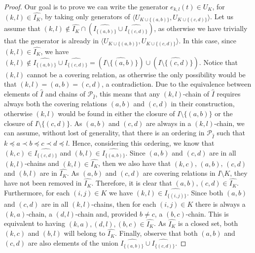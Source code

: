 \documentclass[11pt,letterpaper]{amsart}
\newcommand{\PP}{\mathcal{P}}
\begin{document}
\begin{proof}
Our goal is to prove we can write the generator $e_{k,l}(t)\in U_K$, for $(k,l)\in \widehat{I_K}$, by taking only generators of $\langle U_{K\cup \{(a,b)\}}, U_{K\cup \{(c,d)\}}\rangle$.
Let us assume that $(k,l) \notin \widehat{I_K}\cap (\widehat{I_{\{(a,b)\}}}\cup \widehat{I_{\{(c,d)\}}})$, as otherwise we have trivially that the generator is already in $\langle U_{K\cup \{(a,b)\}}, U_{K\cup \{(c,d)\}}\rangle$.
In this case, since $(k,l)\in \widehat{I_K}$, we have $(k,l)\notin \widehat{I_{\{(a,b)\}}}\cup \widehat{I_{\{(c,d)\}}}=(\widehat{I\setminus\{(a,b)\}})\cup (\widehat{I\setminus\{(c,d)\}})$. Notice that $(k,l)$ cannot be a covering relation, as otherwise the only possibility would be that $(k,l)=(a,b)=(c,d)$, a contradiction.
Due to the equivalence between elements of $\widehat{I}$ and chains of $\PP_{\widehat{I}}$, 
this means that any $(k,l)$-chain of $\widehat{I}$ requires always both the covering relations $(a,b)$ and $(c,d)$ in their construction, otherwise $(k,l)$ would be found in either the closure of $I\setminus\{(a,b)\}$ or the closure of $I\setminus\{(c,d)\}$.
As $(a,b)$ and $(c,d)$ are always in a $(k,l)$-chain, we can assume, without lost of generality, that there is an ordering in $\PP_{\widehat{I}}$ such that $k \preccurlyeq a \prec b\preccurlyeq c \prec d \preccurlyeq l$.
Hence, considering this ordering, we know that
$(k,c)\in \widehat{I_{\{(c,d)\}}}$ and $(b,l)\in \widehat{I_{\{(a,b)\}}}$.
Since $(a,b)$ and $(c,d)$ are in all $(k,l)$-chains and $(k,l)\in \widehat{I_K}$, then we also have that $(k,c)$, $(a,b)$, $(c,d)$ and $(b,l)$ are in $\widehat{I_K}$.
As $(a,b)$ and $(c,d)$ are covering relations in $I\setminus K$, they have not been removed in $\widehat{I_K}$. Therefore, it is clear that $(a,b),(c,d)\in \widehat{I_K}$.
Furthermore, for each $(i,j)\in K$ we have $(k,l)\in \widehat{I_{\{(i,j)\}}}$.
Since both $(a,b)$ and $(c,d)$ are in all $(k,l)$-chains, then for each $(i,j)\in K$ there is always a $(k,a)$-chain, a $(d,l)$-chain and, provided $b\neq c$, a $(b,c)$-chain. This is equivalent to having $(k,a),(d,l),(b,c)\in \widehat{I_K}$. As $\widehat{I_K}$ is a closed set, both $(k,c)$ and $(b,l)$ will belong to $\widehat{I_K}$.
Finally, observe that both $(a,b)$ and $(c,d)$ are also elements of the union $\widehat{I_{\{(a,b)\}}}\cup \widehat{I_{\{(c,d)\}}}$.


\end{proof}
\end{document}
